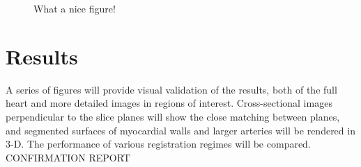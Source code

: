       \begin{figure}[p]
        \centering
        \caption{What a nice figure!}
        \label{fig:0562_correlation}
      \end{figure}
      
      
   
\section{Results} %
\label{sec:results}
  A series of figures will provide visual validation of the results, both of the full heart and more detailed images in regions of interest. Cross-sectional images perpendicular to the slice planes will show the close matching between planes, and segmented surfaces of myocardial walls and larger arteries will be rendered in 3-D. The performance of various registration regimes will be compared.
CONFIRMATION REPORT
  
